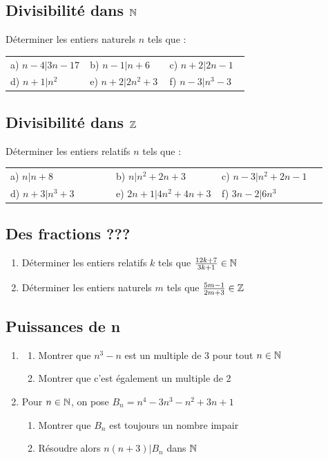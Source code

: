 \documentclass[oneside,12pt]{book}          %
\begin{document}
\subsection{Divisibilité dans ${\mathbb N}$}
Déterminer les entiers naturels $n$ tels que :

\renewcommand{\arraystretch}{1.2}
\begin{tabular}{p{0.33\linewidth} p{0.33\linewidth} p{0.33\linewidth}}
	a) $n-4\vert 3n-17$ & b) $n-1 \vert n+6$ & c) $n+2 \vert 2n-1$ \\
	d) $n+1 \vert n^2$ & e) $n+2 \vert 2n^2+3$ & f) $n-3 \vert n^3-3$
\end{tabular} 
        
        
        
\subsection{Divisibilité dans ${\mathbb Z}$}
Déterminer les entiers relatifs $n$ tels que :

\renewcommand{\arraystretch}{1.2}
\begin{tabular}{p{0.33\linewidth} p{0.33\linewidth} p{0.33\linewidth}}
	a) $n \vert n+8$ & b) $n \vert n^2+2n+3$ & c) $n-3 \vert n^2+2n-1$ \\
	d) $n+3 \vert n^3+3$ & e) $2n+1 \vert 4n^2+4n+3$ & f) $3n-2 \vert 6n^3$
\end{tabular} 



\subsection{Des fractions ???}
\begin{enumerate}
	\item Déterminer les entiers relatifs $k$ tels que $\frac{12k+7}{3k+1}\in{\mathbb N}$ 
	\item Déterminer les entiers naturels $m$ tels que $\frac{5m-1}{2m+3}\in{\mathbb Z}$
\end{enumerate}



\subsection{Puissances de n}
\begin{enumerate}
    \item \begin{enumerate}
        \item Montrer que $n^3-n$ est un multiple de 3 pour tout ${n\in\mathbb N}$
        \item Montrer que c'est également un multiple de 2
    \end{enumerate}
    \item Pour ${n\in\mathbb N}$, on pose $B_n=n^4-3n^3-n^2+3n+1$
    \begin{enumerate}
        \item Montrer que $B_n$ est toujours un nombre impair
        \item Résoudre alors $n(n+3)\vert B_n$ dans ${\mathbb N}$
    \end{enumerate}
\end{enumerate}
\end{document}
